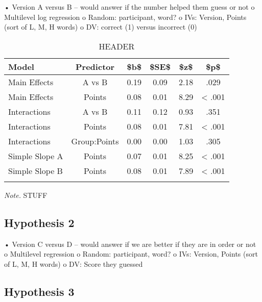 \documentclass[man]{apa6}
\theoremstyle{definition}
\theoremstyle{definition}
\theoremstyle{definition}
\theoremstyle{remark}
\begin{document}
• Version A versus B -- would answer if the number helped them guess or
not o Multilevel log regression o Random: participant, word? o IVs:
Version, Points (sort of L, M, H words) o DV: correct (1) versus
incorrect (0)

\begin{table}[tbp]
\begin{center}
\begin{threeparttable}
\caption{\label{tab:ab_table}HEADER}
\begin{tabular}{lccccc}
\toprule
Model & \multicolumn{1}{c}{Predictor} & \multicolumn{1}{c}{\$b\$} & \multicolumn{1}{c}{\$SE\$} & \multicolumn{1}{c}{\$z\$} & \multicolumn{1}{c}{\$p\$}\\
\midrule
Main Effects & A vs B & 0.19 & 0.09 & 2.18 & .029\\
Main Effects & Points & 0.08 & 0.01 & 8.29 & < .001\\
Interactions & A vs B & 0.11 & 0.12 & 0.93 & .351\\
Interactions & Points & 0.08 & 0.01 & 7.81 & < .001\\
Interactions & Group:Points & 0.00 & 0.00 & 1.03 & .305\\
Simple Slope A & Points & 0.07 & 0.01 & 8.25 & < .001\\
Simple Slope B & Points & 0.08 & 0.01 & 7.89 & < .001\\
\bottomrule
\addlinespace
\end{tabular}
\begin{tablenotes}[para]
\normalsize{\textit{Note.} STUFF}
\end{tablenotes}
\end{threeparttable}
\end{center}
\end{table}

\hypertarget{hypothesis-2}{%
\subsection{Hypothesis 2}\label{hypothesis-2}}

• Version C versus D -- would answer if we are better if they are in
order or not o Multilevel regression o Random: participant, word? o IVs:
Version, Points (sort of L, M, H words) o DV: Score they guessed

\hypertarget{hypothesis-3}{%
\subsection{Hypothesis 3}\label{hypothesis-3}}
\end{document}

